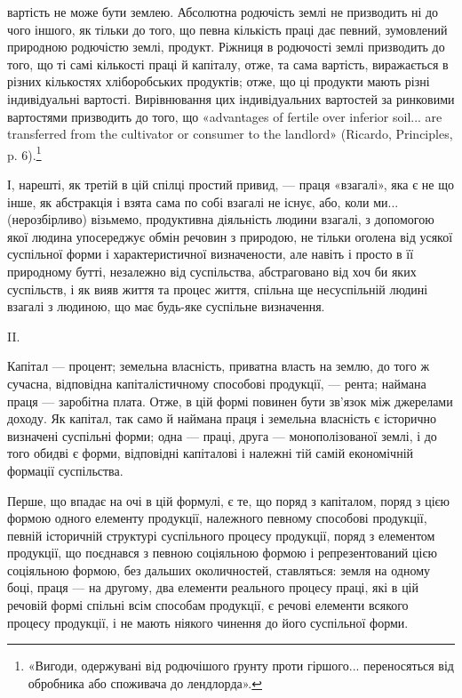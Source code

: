 \parcont{}  %
вартість не може бути землею. Абсолютна родючість землі не призводить ні до
чого іншого, як тільки до того, що певна кількість праці дає певний, зумовлений
природною родючістю землі, продукт. Ріжниця в родючості землі призводить
до того, що ті самі кількості праці й капіталу, отже, та сама вартість, виражається
в різних кількостях хліборобських продуктів; отже, що ці продукти
мають різні індивідуальні вартості. Вирівнювання цих індивідуальних вартостей
за ринковими вартостями призводить до того, що «advantages of fertile over inferior
soil... are transferred from the cultivator or consumer to the landlord» (Ricardo,
Principles, p. 6).\footnote*{
«Вигоди, одержувані від родючішого ґрунту проти гіршого... переносяться від обробника або
споживача до лендлорда».
}

І, нарешті, як третій в цій спілці простий привид, — праця «взагалі»,
яка є не що інше, як абстракція і взята сама по собі взагалі не існує, або,
коли ми... (нерозбірливо) візьмемо, продуктивна діяльність людини взагалі,
з допомогою якої людина упосереджує обмін речовин з природою, не тільки
оголена від усякої суспільної форми і характеристичної визначености, але навіть
і просто в її природному бутті, незалежно від суспільства, абстраговано від
хоч би яких суспільств, і як вияв життя та процес життя, спільна ще несуспільній
людині взагалі з людиною, що має будь-яке суспільне визначення.

II.

Капітал — процент; земельна власність, приватна власть на землю, до того ж
сучасна, відповідна капіталістичному способові продукції, — рента; наймана праця
— заробітна плата. Отже, в цій формі повинен бути зв’язок між джерелами
доходу. Як капітал, так само й наймана праця і земельна власність є історично
визначені суспільні форми; одна — праці, друга — монополізованої землі, і до
того обидві є форми, відповідні капіталові і належні тій самій економічній
формації суспільства.

Перше, що впадає на очі в цій формулі, є те, що поряд з капіталом,
поряд з цією формою одного елементу продукції, належного певному способові
продукції, певній історичній структурі суспільного процесу продукції, поряд
з елементом продукції, що поєднався з певною соціяльною формою і репрезентований
цією соціяльною формою, без дальших околичностей, ставляться: земля
на одному боці, праця — на другому, два елементи реального процесу праці,
які в цій речовій формі спільні всім способам продукції, є речові елементи
всякого процесу продукції, і не мають ніякого чинення до його суспільної форми.

